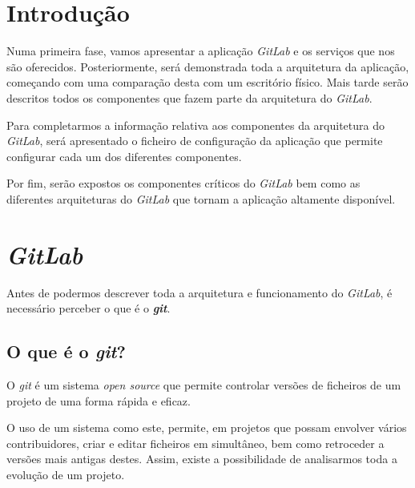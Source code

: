 \documentclass[12pt,a4paper]{article}
\begin{document}
\clearpage
\tableofcontents
\listoffigures
\clearpage




\setcounter{page}{1}
\section{Introdução}



\bigbreak
Numa primeira fase, vamos apresentar a aplicação \emph{GitLab} e os serviços que nos são oferecidos. Posteriormente, será demonstrada toda a arquitetura da aplicação, começando com uma comparação desta com um escritório físico. Mais tarde serão descritos todos os componentes que fazem parte da arquitetura do \emph{GitLab}.

\bigbreak
Para completarmos a informação relativa aos componentes da arquitetura do \emph{GitLab}, será apresentado o ficheiro de configuração da aplicação que permite configurar cada um dos diferentes componentes.

\bigbreak
Por fim, serão expostos os componentes críticos do \emph{GitLab} bem como as diferentes arquiteturas do \emph{GitLab} que tornam a aplicação altamente disponível.






\newpage
\section{\emph{GitLab}}
Antes de podermos descrever toda a arquitetura e funcionamento do \emph{GitLab}, é necessário perceber o que é o \emph{\textbf{git}}.

\subsection{O que é o \emph{git}?}
O \emph{git} é um sistema \emph{open source} que permite controlar versões de ficheiros de um projeto de uma forma rápida e eficaz.

O uso de um sistema como este, permite, em projetos que possam envolver vários contribuidores, criar e editar ficheiros em simultâneo, bem como retroceder a versões mais antigas destes. Assim, existe a possibilidade de analisarmos toda a evolução de um projeto.
\end{document}
